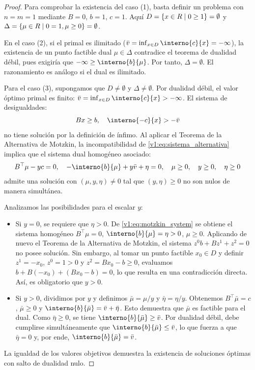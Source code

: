 \begin{proof}
 Para comprobar la existencia del caso (1), basta definir un problema con $n = m = 1$ mediante $B = 0$, $b = 1$, $c = 1$. Aquí $D = \{x \in R \mid 0 \ge 1\} = \emptyset$ y $\Delta = \{\mu \in R \mid 0 = 1, \mu \ge 0\} = \emptyset$.
 
 En el caso (2), si el primal es ilimitado ($\bar{v} = \inf_{x \in D} \interno{c}{x} = -\infty$), la existencia de un punto factible dual $\mu \in \Delta$ contradice el teorema de dualidad débil, pues exigiría que $-\infty \ge \interno{b}{\mu}$. Por tanto, $\Delta = \emptyset$. El razonamiento es análogo si el dual es ilimitado.
 
 Para el caso (3), supongamos que $D \neq \emptyset$ y $\Delta \neq \emptyset$. Por dualidad débil, el valor óptimo primal es finito: $\bar{v} = \inf_{x \in D} \interno{c}{x} > -\infty$. El sistema de desigualdades:
 \begin{equation}
 Bx \ge b, \quad \interno{-c}{x} > -\bar{v}
 \label{v1:eq:sistema_alternativa}
 \end{equation}
 no tiene solución por la definición de ínfimo. Al aplicar el Teorema de la Alternativa de Motzkin, la incompatibilidad de \eqref{v1:eq:sistema_alternativa} implica que el sistema dual homogéneo asociado:
 \begin{equation}
 B^\top \mu - yc = 0, \quad -\interno{b}{\mu} + y\bar{v} + \eta = 0, \quad \mu \ge 0, \quad y \ge 0, \quad \eta \ge 0
 \label{v1:eq:motzkin_system}
 \end{equation}
 admite una solución con $(\mu, y, \eta) \neq 0$ tal que $(y, \eta) \ge 0$ no son nulos de manera simultánea.
 
 Analizamos las posibilidades para el escalar $y$:
 \begin{itemize}
 \item Si $y = 0$, se requiere que $\eta > 0$. De \eqref{v1:eq:motzkin_system} se obtiene el sistema homogéneo $B^\top \mu = 0$, $\interno{b}{\mu} = \eta > 0$, $\mu \ge 0$. Aplicando de nuevo el Teorema de la Alternativa de Motzkin, el sistema $z^0 b + B z^1 + z^2 = 0$ no posee solución. Sin embargo, al tomar un punto factible $x_0 \in D$ y definir $z^1 = -x_0$, $z^0 = 1 > 0$ y $z^2 = Bx_0 - b \ge 0$, evaluamos $b + B(-x_0) + (Bx_0 - b) = 0$, lo que resulta en una contradicción directa. Así, es obligatorio que $y > 0$.
 
 \item Si $y > 0$, dividimos por $y$ y definimos $\bar{\mu} = \mu/y$ y $\bar{\eta} = \eta/y$. Obtenemos $B^\top \bar{\mu} = c$, $\bar{\mu} \ge 0$ y $\interno{b}{\bar{\mu}} = \bar{v} + \bar{\eta}$. Esto demuestra que $\bar{\mu}$ es factible para el dual. Como $\bar{\eta} \ge 0$, se tiene $\interno{b}{\bar{\mu}} \ge \bar{v}$. Por dualidad débil, debe cumplirse simultáneamente que $\interno{b}{\bar{\mu}} \le \bar{v}$, lo que fuerza a que $\bar{\eta} = 0$ y, por ende, $\interno{b}{\bar{\mu}} = \bar{v}$.
 \end{itemize}
 La igualdad de los valores objetivos demuestra la existencia de soluciones óptimas con salto de dualidad nulo.
\end{proof}

